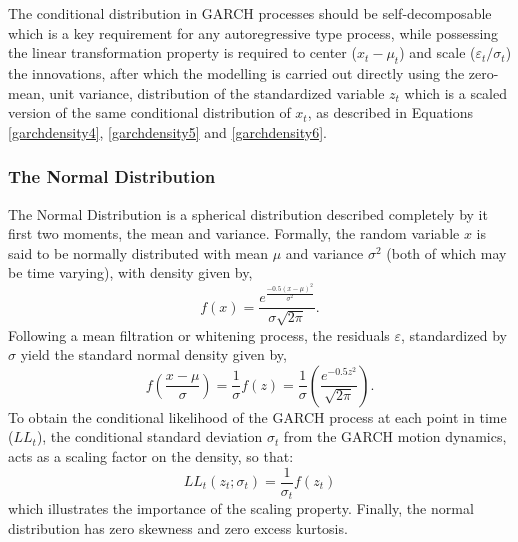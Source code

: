 The conditional distribution in GARCH processes should be self-decomposable
which is a key requirement for any autoregressive type process, while
possessing the linear transformation property is required to center ($x_t-\mu_t$)
and scale ($\varepsilon_t/\sigma_t$) the innovations, after which the modelling
is carried out directly using the zero-mean, unit variance, distribution of the
standardized variable $z_t$ which is a scaled version of the same conditional
distribution of $x_t$, as described in Equations \ref{garchdensity4},
\ref{garchdensity5} and \ref{garchdensity6}.

\subsubsection{The Normal Distribution}\label{normdist}
The Normal Distribution is a spherical distribution described completely by it
first two moments, the mean and variance. Formally, the random variable $x$ is
said to be normally distributed with mean $\mu$ and variance $\sigma^2$
(both of which may be time varying), with density given by,
\begin{equation}\label{eq:dnorm1}
f\left( x \right) = \frac{{{e^{\frac{{ - 0.5{{\left( {x - \mu } \right)}^2}}}
{{{\sigma ^2}}}}}}}
{{\sigma \sqrt {2\pi } }}.
\end{equation}
Following a mean filtration or whitening process, the residuals $\varepsilon$,
standardized by $\sigma$ yield the standard normal density given by,
\begin{equation}\label{eq:dnorm2}
f\left( {\frac{{x - \mu }}{\sigma }} \right) = \frac{1}
{\sigma }f\left( z \right) = \frac{1}
{\sigma }\left( {\frac{{{e^{ - 0.5{z^2}}}}}
{{\sqrt {2\pi } }}} \right).
\end{equation}
To obtain the conditional likelihood of the GARCH process at each point in time
($LL_t$), the conditional standard deviation $\sigma_t$ from the GARCH motion
dynamics, acts as a scaling factor on the density, so that:
\begin{equation}\label{eq:dnorm3}
L{L_t}\left( {{z_t};{\sigma _t}} \right) = \frac{1}
{{{\sigma _t}}}f\left( {{z_t}} \right)
\end{equation}
which illustrates the importance of the scaling property. Finally, the normal
distribution has zero skewness and zero excess kurtosis.

